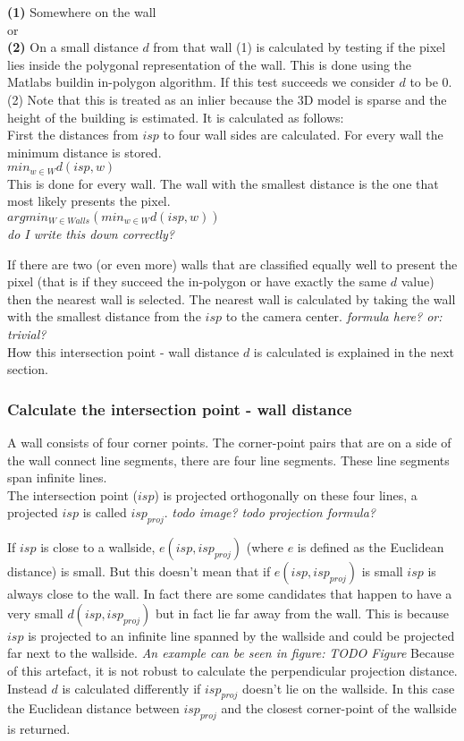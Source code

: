 \documentclass[10pt]{article}
\begin{document}
\textbf{(1)} Somewhere on the wall 
\\
or
\\
\textbf{(2)} On a small distance $d$ from that wall
(1) is calculated by testing if the pixel lies inside the polygonal
representation of the wall. This is done using the Matlabs buildin in-polygon
algorithm. If this test succeeds we consider $d$ to be 0.\\

(2) Note that this is treated as an inlier because the 3D model is sparse and the height of
the building is estimated. It is calculated as follows: \\
First the distances from $isp$ to four wall sides are calculated.
For every wall the minimum distance is stored.\\
$min_{w\in W} d(isp, w)$\\
This is done for every wall. The wall with the smallest distance is the one that most likely presents the pixel.\\
$arg min_{W \in Walls} ( min_{w\in W} d(isp, w) )$\\
\textit{ do I write this down correctly?}


If there are two (or even more) walls that are classified equally well to
present the pixel (that is if they succeed the in-polygon or have exactly the
same $d$ value) then the nearest wall is selected. The nearest wall is
calculated by taking the wall with the smallest distance from the $isp$ to the
camera center.
\textit{ formula here? or: trivial?}\\
How this intersection point - wall distance $d$ is calculated is explained in
the next section.

\subsubsection{Calculate the intersection point - wall distance}
A wall consists of four corner points. The corner-point pairs that are on a
side of the wall connect line segments, there are four line segments. These
line segments span infinite lines.\\

The intersection point ($isp$) is projected orthogonally on these four lines, a
projected $isp$ is called $isp_{proj}$.
\textit{ todo image?}
\textit{ todo projection formula?}

If $isp$ is close to a wallside, $e(isp, isp_{proj})$ (where $e$ is defined as
the Euclidean distance) is small.  But this doesn't mean that if
$e(isp,isp_{proj})$ is small $isp$ is always close to the wall. In fact there are
some candidates that happen to have a very small $d(isp, isp_{proj})$ but in fact
lie far away from the wall. This is because $isp$ is projected to an infinite
line spanned by the wallside and could be projected far next to the wallside.
\textit{ An example can be seen in figure:}
\textit{ TODO Figure}
Because of this artefact, it is not robust to calculate the perpendicular
projection distance.  Instead $d$ is calculated differently if $isp_{proj}$
doesn't lie on the wallside.  In this case the Euclidean distance between
$isp_{proj}$ and the closest corner-point of the wallside is returned.
\end{document}
